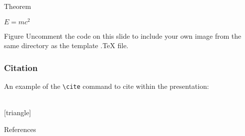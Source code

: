 \documentclass[aspectratio=169,xcolor=dvipsnames]{beamer}
\begin{document}
\begin{frame}{Theorem}
    \begin{theorem}
        $E = mc^2$
    \end{theorem}
\end{frame}

\begin{frame}{Figure}
    Uncomment the code on this slide to include your own image from the same directory as the template .TeX file.
\end{frame}

\begin{frame}[fragile] %
    \frametitle{Citation}
    An example of the \verb|\cite| command to cite within the presentation:\\~
\end{frame}

\nocite{*}

[triangle]
\begin{frame}{References}
    \footnotesize
    
    
\end{frame}
\end{document}

